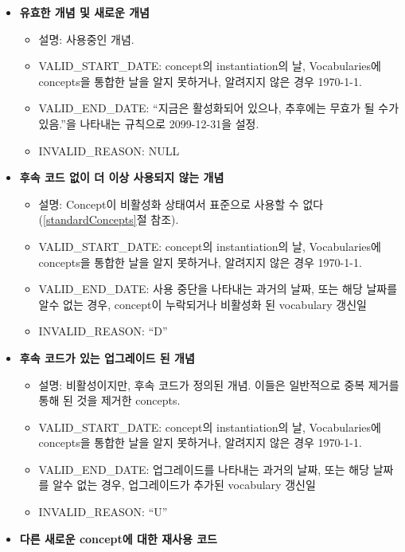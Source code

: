 \documentclass[11pt]{book}
\providecommand{\tightlist}{%
  \setlength{\itemsep}{0pt}\setlength{\parskip}{0pt}}
\theoremstyle{definition}
\theoremstyle{definition}
\theoremstyle{definition}
\theoremstyle{remark}
\begin{document}
\begin{itemize}
\tightlist
\item
  \textbf{유효한 개념 및 새로운 개념}

  \begin{itemize}
  \tightlist
  \item
    설명: 사용중인 개념.
  \item
    VALID\_START\_DATE: concept의 instantiation의 날, Vocabularies에
    concepts을 통합한 날을 알지 못하거나, 알려지지 않은 경우 1970-1-1.
  \item
    VALID\_END\_DATE: ``지금은 활성화되어 있으나, 추후에는 무효가 될
    수가 있음.''을 나타내는 규칙으로 2099-12-31을 설정.
  \item
    INVALID\_REASON: NULL
  \end{itemize}
\item
  \textbf{후속 코드 없이 더 이상 사용되지 않는 개념}

  \begin{itemize}
  \tightlist
  \item
    설명: Concept이 비활성화 상태여서 표준으로 사용할 수 없다
    (\ref{standardConcepts}절 참조).
  \item
    VALID\_START\_DATE: concept의 instantiation의 날, Vocabularies에
    concepts을 통합한 날을 알지 못하거나, 알려지지 않은 경우 1970-1-1.
  \item
    VALID\_END\_DATE: 사용 중단을 나타내는 과거의 날짜, 또는 해당 날짜를
    알수 없는 경우, concept이 누락되거나 비활성화 된 vocabulary 갱신일
  \item
    INVALID\_REASON: ``D''
  \end{itemize}
\item
  \textbf{후속 코드가 있는 업그레이드 된 개념}

  \begin{itemize}
  \tightlist
  \item
    설명: 비활성이지만, 후속 코드가 정의된 개념. 이들은 일반적으로 중복
    제거를 통해 된 것을 제거한 concepts.
  \item
    VALID\_START\_DATE: concept의 instantiation의 날, Vocabularies에
    concepts을 통합한 날을 알지 못하거나, 알려지지 않은 경우 1970-1-1.
  \item
    VALID\_END\_DATE: 업그레이드를 나타내는 과거의 날짜, 또는 해당
    날짜를 알수 없는 경우, 업그레이드가 추가된 vocabulary 갱신일
  \item
    INVALID\_REASON: ``U''
  \end{itemize}
\item
  \textbf{다른 새로운 concept에 대한 재사용 코드}


\end{itemize}
\end{document}
